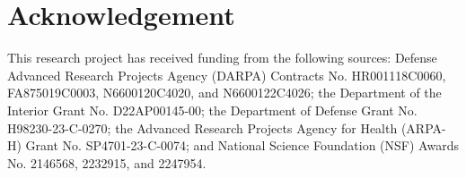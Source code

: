 \section*{Acknowledgement}
This research project has received funding from the following sources: 
Defense Advanced Research Projects Agency (DARPA) Contracts No. HR001118C0060, FA875019C0003, N6600120C4020, and N6600122C4026;
the Department of the Interior Grant No. D22AP00145-00;
the Department of Defense Grant No. H98230-23-C-0270;
the Advanced Research Projects Agency for Health (ARPA-H) Grant No. SP4701-23-C-0074;
and National Science Foundation (NSF) Awards No. 2146568, 2232915, and 2247954.

